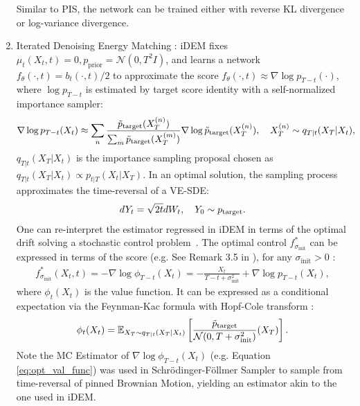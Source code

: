 \begin{enumerate}[label=({{\arabic*}}), leftmargin=*]
        Similar to PIS, the network can be trained either with reverse KL divergence or log-variance divergence.
        \item Iterated Denoising Energy Matching \citep[iDEM,][]{akhounditerated}: iDEM fixes $\mu_t(X_t, t) = 0, p_\text{prior} = \mathcal{N}(0, T^2 I)$, and learns a network $f_\theta(\cdot, t) = b_t(\cdot, t) / 2$ to approximate the score  $f_\theta(\cdot, t) \approx \nabla \log p_{T-t} (\cdot)$, where $\log p_{T-t}$ is estimated by target score identity \citep[TSI, ][]{de2024target} with a self-normalized importance sampler:
        \begin{align}
           {\nabla \log p_{T-t} (X_t)}& \approx \sum_{n} \frac{\tilde{p}_\text{target} (X_T^{(n)})}{ \sum_{m}  \tilde{p}_\text{target}(X_T^{(m)})}\nabla \log \tilde{p}_\text{target} (X_T^{(n)}), \quad X_T^{(n)}\sim  q_{T|t}(X_T | X_t),
        \end{align}
        $q_{T|t}(X_T | X_t)$ is the importance sampling proposal chosen as $q_{T|t}(X_T | X_t)\propto p_{t|T}(X_t | X_T)$.
        In an optimal solution, the sampling process approximates the time-reversal of a VE-SDE:
         \begin{align}\label{eq:idem_y}
            dY_t = \sqrt{2 t} dW_t, \quad  Y_0 \sim {p_\text{target}}.
        \end{align}
        One can re-interpret the estimator regressed in iDEM in terms of the optimal drift solving a stochastic control problem~\citep{huang2021schr}. The optimal control $f^*_{\sigma_{\mathrm{init}}}$ can be expressed in terms of the score (e.g. See Remark 3.5 in \cite{reusmooth}), for any $\sigma_{\mathrm{init}}>0$ :
        \begin{align}
             f^*_{\sigma_{\mathrm{init}}}(X_t,t) = - \nabla \log \phi_{T-t}(X_t) = -\frac{X_t}{T-t +\sigma_{\mathrm{init}}^2} +\nabla \log {p_{T-t}(X_t)},
        \end{align}
        where $\phi_t(X_t) $ is the 
     value function. 
     It can be expressed as a conditional expectation via the Feynman-Kac formula with Hopf-Cole transform \citep{hopf1950partial,cole1951quasi,fleming1989logarithmic}: \begin{align}\label{eq:opt_val_func}
            \phi_t(X_t) = \mathbb{E}_{X_T \sim q_{T|t}(X_T|X_t)}\left [\frac{\tilde{p}_\text{target}}{\mathcal{N}(0, T+ \sigma_{\mathrm{init}}^2)}(X_T)\right]. 
        \end{align}
       Note the MC Estimator of $\nabla \log \phi_{T-t}(X_t)$ (e.g. Equation \ref{eq:opt_val_func}) was used in Schr\"odinger-F\"ollmer Sampler \citep[SFS, ][]{huang2021schr} to sample from time-reversal of pinned Brownian Motion, yielding an estimator akin to the one used in iDEM.

\end{enumerate}
